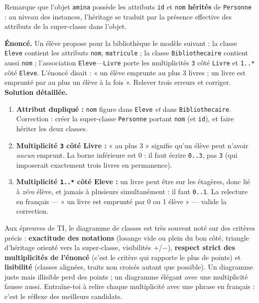\documentclass[11pt]{article}
\begin{document}
Remarque que l'objet \texttt{amina} possède les attributs \texttt{id} et \texttt{nom} \textbf{hérités} de \texttt{Personne} : au niveau des instances, l'héritage se traduit par la présence effective des attributs de la super-classe dans l'objet.

\begin{exoresolu}
\textbf{Énoncé.} Un élève propose pour la bibliothèque le modèle suivant : la classe \texttt{Eleve} contient les attributs \texttt{nom}, \texttt{matricule} ; la classe \texttt{Bibliothecaire} contient aussi \texttt{nom} ; l'association \texttt{Eleve}---\texttt{Livre} porte les multiplicités \texttt{3} côté \texttt{Livre} et \texttt{1..*} côté \texttt{Eleve}. L'énoncé disait : « un élève emprunte au plus 3 livres ; un livre est emprunté par au plus un élève à la fois ». Relever trois erreurs et corriger.
\tcblower
\textbf{Solution détaillée.}
\begin{enumerate}
  \item \textbf{Attribut dupliqué :} \texttt{nom} figure dans \texttt{Eleve} \emph{et} dans \texttt{Bibliothecaire}. Correction : créer la super-classe \texttt{Personne} portant \texttt{nom} (et \texttt{id}), et faire hériter les deux classes.
  \item \textbf{Multiplicité \texttt{3} côté Livre :} « au plus 3 » signifie qu'un élève peut n'avoir \emph{aucun} emprunt. La borne inférieure est 0 : il faut écrire \texttt{0..3}, pas \texttt{3} (qui imposerait exactement trois livres en permanence).
  \item \textbf{Multiplicité \texttt{1..*} côté Eleve :} un livre peut être sur les étagères, donc lié à \emph{zéro} élève, et jamais à plusieurs simultanément : il faut \texttt{0..1}. La relecture en français — « un livre est emprunté par 0 ou 1 élève » — valide la correction.
\end{enumerate}
\end{exoresolu}

\begin{savaistu}
Aux épreuves de TI, le diagramme de classes est très souvent noté sur des critères précis : \textbf{exactitude des notations} (losange vide ou plein du bon côté, triangle d'héritage orienté vers la super-classe, visibilités $+$/$-$), \textbf{respect strict des multiplicités de l'énoncé} (c'est le critère qui rapporte le plus de points) et \textbf{lisibilité} (classes alignées, traits non croisés autant que possible). Un diagramme juste mais illisible perd des points ; un diagramme élégant avec une multiplicité fausse aussi. Entraîne-toi à relire chaque multiplicité avec une phrase en français : c'est le réflexe des meilleurs candidats.
\end{savaistu}
\end{document}

